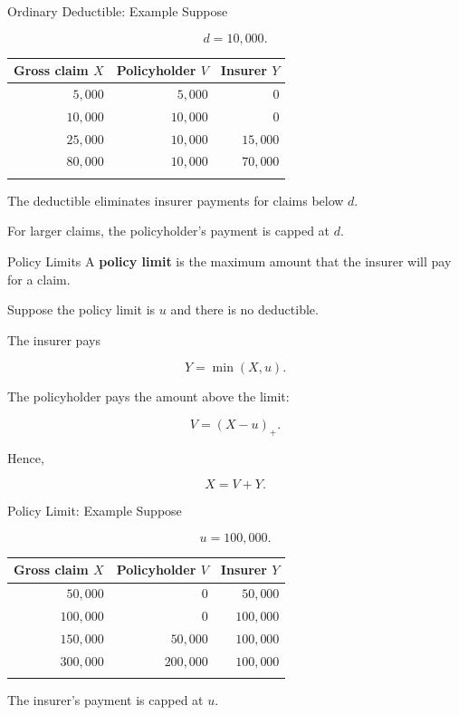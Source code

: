 \documentclass[
  ignorenonframetext,
  aspectratio=169,
]{beamer}
\newcounter{none} %
\begin{document}
\begin{frame}{Ordinary Deductible: Example}
\protect{}\label{ordinary-deductible-example}
Suppose

\[
d=10{,}000.
\]

{\def\LTcaptype{none} %
\begin{longtable}[]{@{}rrr@{}}
\toprule\noalign{}
Gross claim \(X\) & Policyholder \(V\) & Insurer \(Y\) \\
\midrule\noalign{}
\endhead
\(5{,}000\) & \(5{,}000\) & \(0\) \\
\(10{,}000\) & \(10{,}000\) & \(0\) \\
\(25{,}000\) & \(10{,}000\) & \(15{,}000\) \\
\(80{,}000\) & \(10{,}000\) & \(70{,}000\) \\
\bottomrule\noalign{}
\end{longtable}
}

The deductible eliminates insurer payments for claims below \(d\).

For larger claims, the policyholder's payment is capped at \(d\).
\end{frame}

\begin{frame}{Policy Limits}
\protect{}\label{policy-limits}
A \textbf{policy limit} is the maximum amount that the insurer will pay
for a claim.

Suppose the policy limit is \(u\) and there is no deductible.

The insurer pays

\[
\boxed{Y=\min(X,u)}.
\]

The policyholder pays the amount above the limit:

\[
\boxed{V=(X-u)_+}.
\]

Hence,

\[
X=V+Y.
\]
\end{frame}

\begin{frame}{Policy Limit: Example}
\protect{}\label{policy-limit-example}
Suppose

\[
u=100{,}000.
\]

{\def\LTcaptype{none} %
\begin{longtable}[]{@{}rrr@{}}
\toprule\noalign{}
Gross claim \(X\) & Policyholder \(V\) & Insurer \(Y\) \\
\midrule\noalign{}
\endhead
\(50{,}000\) & \(0\) & \(50{,}000\) \\
\(100{,}000\) & \(0\) & \(100{,}000\) \\
\(150{,}000\) & \(50{,}000\) & \(100{,}000\) \\
\(300{,}000\) & \(200{,}000\) & \(100{,}000\) \\
\bottomrule\noalign{}
\end{longtable}
}

The insurer's payment is capped at \(u\).
\end{frame}
\end{document}
